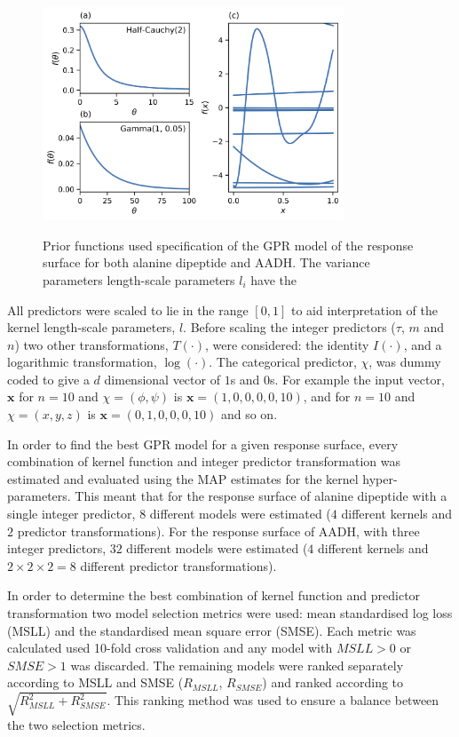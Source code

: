 \begin{figure}
    \centering
    \caption{Prior functions used specification of the GPR model of the response surface for both alanine dipeptide and AADH. The variance parameters  length-scale parameters $l_{i}$ have the }
    \includegraphics[width=0.8\textwidth]{chapters/msm_optimization/figures/prior_functions.png}
    \label{fig:priors}
\end{figure}

All predictors were scaled to lie in the range $[0, 1]$ to aid interpretation of the kernel length-scale parameters, $l$. Before scaling the integer predictors ($\tau$, $m$ and $n$) two other transformations, $T(\cdot)$, were considered: the identity $I(\cdot)$, and a logarithmic transformation, $\log(\cdot)$. The categorical predictor, $\chi$, was dummy coded \cite{dalyDummyCodingVs2016} to give a $d$ dimensional vector of $1$s and $0$s. For example the input vector, $\mathbf{x}$ for $n=10$ and $\chi=(\phi, \psi)$ is $\mathbf{x} = (1, 0, 0, 0, 0, 10)$, and for $n=10$ and $\chi=(x, y, z)$ is  $\mathbf{x} = (0, 1, 0, 0, 0, 10)$ and so on. 

In order to find the best GPR model for a given response surface, every combination of kernel function and integer predictor transformation was estimated and evaluated using the MAP estimates for the kernel hyper-parameters. This meant that for the response surface of alanine dipeptide with a single integer predictor, $8$ different models were estimated ($4$ different kernels and $2$ predictor transformations). For the response surface of AADH, with three integer predictors, $32$ different models were estimated ($4$ different kernels and $2\times2\times2=8$ different predictor transformations). 

In order to determine the best combination of kernel function and predictor transformation two model selection metrics were used:  mean standardised log loss (MSLL) and the standardised mean square error (SMSE). Each metric was calculated used 10-fold cross validation and any model with $MSLL > 0$ or $SMSE > 1$ was discarded. The remaining models were ranked separately according to MSLL and SMSE ($R_{MSLL}$, $R_{SMSE}$) and ranked according to $\sqrt{R_{MSLL}^2 + R_{SMSE}^2}$. This ranking method was used to ensure a balance between the two selection metrics. 

